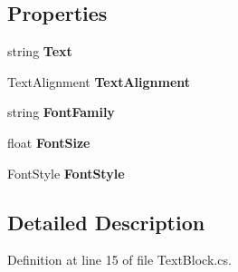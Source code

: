 \subsection*{Properties}
\begin{DoxyCompactItemize}
\item 
\hypertarget{class_msdn_1_1_u_i_framework_1_1_text_block_adb2a2ffb3dfb4a01a54f7addc4740f4f}{
string {\bfseries Text}}
\label{class_msdn_1_1_u_i_framework_1_1_text_block_adb2a2ffb3dfb4a01a54f7addc4740f4f}

\item 
\hypertarget{class_msdn_1_1_u_i_framework_1_1_text_block_a5520820cecde723516e9adca2b0b59e4}{
TextAlignment {\bfseries TextAlignment}}
\label{class_msdn_1_1_u_i_framework_1_1_text_block_a5520820cecde723516e9adca2b0b59e4}

\item 
\hypertarget{class_msdn_1_1_u_i_framework_1_1_text_block_aab3e41200ea7b98069303dfa3809fa9a}{
string {\bfseries FontFamily}}
\label{class_msdn_1_1_u_i_framework_1_1_text_block_aab3e41200ea7b98069303dfa3809fa9a}

\item 
\hypertarget{class_msdn_1_1_u_i_framework_1_1_text_block_ab9a9c2c05a925b2d63351a46f0201af5}{
float {\bfseries FontSize}}
\label{class_msdn_1_1_u_i_framework_1_1_text_block_ab9a9c2c05a925b2d63351a46f0201af5}

\item 
\hypertarget{class_msdn_1_1_u_i_framework_1_1_text_block_a21736e4bda24c1b5176882e5526be29a}{
FontStyle {\bfseries FontStyle}}
\label{class_msdn_1_1_u_i_framework_1_1_text_block_a21736e4bda24c1b5176882e5526be29a}

\end{DoxyCompactItemize}


\subsection{Detailed Description}


Definition at line 15 of file TextBlock.cs.

